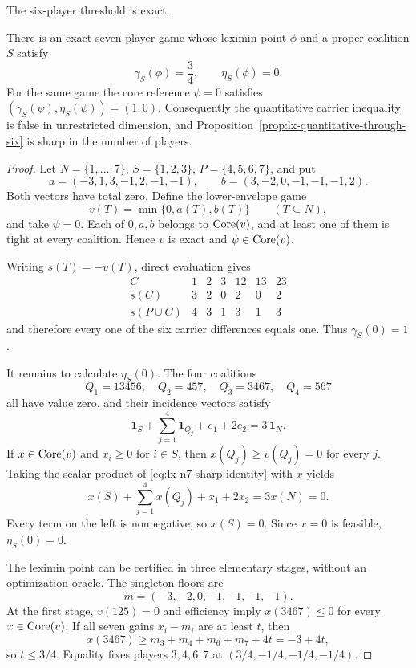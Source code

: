 The six-player threshold is exact.

\begin{proposition}
\label{prop:lx-quantitative-n7-counterexample}
There is an exact seven-player game whose leximin point $\phi$ and a proper
coalition $S$ satisfy
\[
 \gamma_S(\phi)=\frac34,
 \qquad
 \eta_S(\phi)=0.
\]
For the same game the core reference $\psi=0$ satisfies
$(\gamma_S(\psi),\eta_S(\psi))=(1,0)$.
Consequently the quantitative carrier inequality is false in unrestricted
dimension, and Proposition~\ref{prop:lx-quantitative-through-six} is sharp in
the number of players.
\end{proposition}

\begin{proof}
Let $N=\{1,\ldots,7\}$, $S=\{1,2,3\}$, $P=\{4,5,6,7\}$, and put
\[
 a=(-3,1,3,-1,2,-1,-1),
 \qquad
 b=(3,-2,0,-1,-1,-1,2).
\]
Both vectors have total zero.  Define the lower-envelope game
\[
 v(T)=\min\{0,a(T),b(T)\}
 \qquad(T\subseteq N),
\]
and take $\psi=0$.  Each of $0,a,b$ belongs to $\operatorname{Core}(v)$, and at least one
of them is tight at every coalition.  Hence $v$ is exact and
$\psi\in\operatorname{Core}(v)$.

Writing $s(T)=-v(T)$, direct evaluation gives
\[
\begin{array}{c|rrrrrr}
 C&1&2&3&12&13&23\\ \hline
 s(C)&3&2&0&2&0&2\\
 s(P\cup C)&4&3&1&3&1&3
\end{array}
\]
and therefore every one of the six carrier differences equals one.  Thus
$\gamma_S(0)=1$.

It remains to calculate $\eta_S(0)$.  The four coalitions
\[
 Q_1=13456,
 \quad Q_2=457,
 \quad Q_3=3467,
 \quad Q_4=567
\]
all have value zero, and their incidence vectors satisfy
\[
 \mathbf1_S+\sum_{j=1}^4\mathbf1_{Q_j}+e_1+2e_2
 =3\,\mathbf1_N.
 \tag{N7}\label{eq:lx-n7-sharp-identity}
\]
If $x\in\operatorname{Core}(v)$ and $x_i\geq0$ for $i\in S$, then
$x(Q_j)\geq v(Q_j)=0$ for every $j$.  Taking the scalar product of
\eqref{eq:lx-n7-sharp-identity} with $x$ yields
\[
 x(S)+\sum_{j=1}^4x(Q_j)+x_1+2x_2=3x(N)=0.
\]
Every term on the left is nonnegative, so $x(S)=0$.  Since $x=0$ is
feasible, $\eta_S(0)=0$.

The leximin point can be certified in three elementary stages, without an
optimization oracle.  The singleton floors are
\[
 m=(-3,-2,0,-1,-1,-1,-1).
\]
At the first stage, $v(125)=0$ and efficiency imply $x(3467)\leq0$ for
every $x\in\operatorname{Core}(v)$.  If all seven gains $x_i-m_i$ are at least $t$, then
\[
 x(3467)\geq m_3+m_4+m_6+m_7+4t=-3+4t,
\]
so $t\leq3/4$.  Equality fixes players $3,4,6,7$ at
$(3/4,-1/4,-1/4,-1/4)$.


\end{proof}
